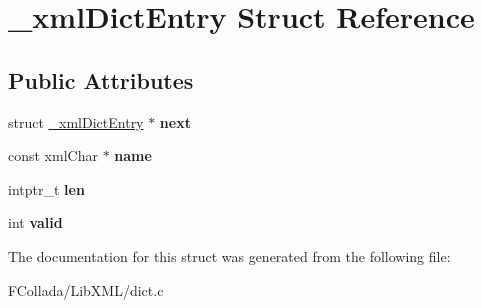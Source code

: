 \hypertarget{struct__xmlDictEntry}{
\section{\_\-xmlDictEntry Struct Reference}
\label{struct__xmlDictEntry}
}
\subsection*{Public Attributes}
\begin{DoxyCompactItemize}
\item 
\hypertarget{struct__xmlDictEntry_ad38b441739752654c61d2cd0faff225d}{
struct \hyperlink{struct__xmlDictEntry}{\_\-xmlDictEntry} $\ast$ {\bfseries next}}
\label{struct__xmlDictEntry_ad38b441739752654c61d2cd0faff225d}

\item 
\hypertarget{struct__xmlDictEntry_a2b9048b75611eab3643df4c9a5980e72}{
const xmlChar $\ast$ {\bfseries name}}
\label{struct__xmlDictEntry_a2b9048b75611eab3643df4c9a5980e72}

\item 
\hypertarget{struct__xmlDictEntry_a3aaf5d8476e921659b9c709cabedf68d}{
intptr\_\-t {\bfseries len}}
\label{struct__xmlDictEntry_a3aaf5d8476e921659b9c709cabedf68d}

\item 
\hypertarget{struct__xmlDictEntry_a96fff968e297391cfa6808273e0c6d25}{
int {\bfseries valid}}
\label{struct__xmlDictEntry_a96fff968e297391cfa6808273e0c6d25}

\end{DoxyCompactItemize}


The documentation for this struct was generated from the following file:\begin{DoxyCompactItemize}
\item 
FCollada/LibXML/dict.c\end{DoxyCompactItemize}
